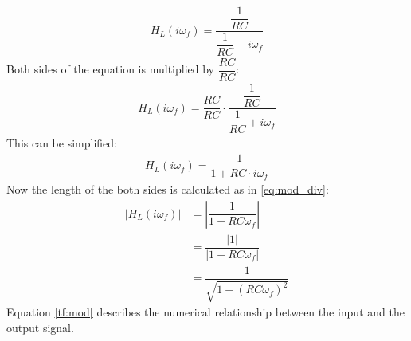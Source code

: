\begin{align} \label{eq:trans_low}
H_{L}(i \omega_f) = \dfrac{\dfrac{1}{RC}}{\dfrac{1}{RC}+i \omega_f} 
\end{align}
Both sides of the equation is multiplied by $\dfrac{RC}{RC}$:
\begin{align}
H_{L}(i \omega_f) = \dfrac{RC}{RC} \cdot \dfrac{\dfrac{1}{RC}}{\dfrac{1}{RC}+i \omega_f} 
\end{align}
This can be simplified:
\begin{align}
H_{L}(i \omega_f) =  \dfrac{1}{1+RC \cdot i \omega_f} 
\end{align}
Now the length of the both sides is calculated as in \eqref{eq:mod_div}:
\begin{align}
\left|H_{L}(i \omega_f) \right| &=  \left|\dfrac{1}{1+RC \omega_f} \right| 
\\
&=\dfrac{|1|}{|1+RC\omega_f |}
\\
&=  \dfrac{1}{\sqrt{1+(RC \omega_f)^2}} \label{tf:mod}
\end{align}
Equation \eqref{tf:mod} describes the numerical relationship between the input and the output signal.
